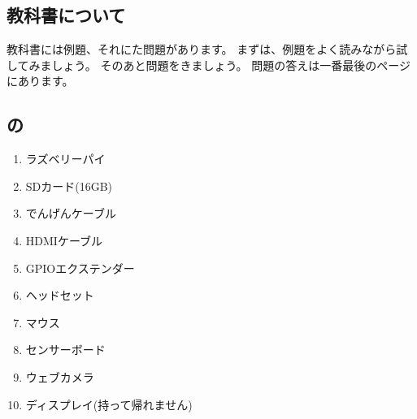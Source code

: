 % 
% 
\subsection{教科書について}
  教科書には例題、それにた問題があります。
  まずは、例題をよく読みながら試してみましょう。
  そのあと問題をきましょう。
  問題の答えは一番最後のページにあります。
\clearpage

% 
% 
\subsection{の}

\begin{enumerate}
  \item ラズベリーパイ
  \item SDカード(16GB)
  \item でんげんケーブル
  \item HDMIケーブル
  \item GPIOエクステンダー
  \item ヘッドセット
  \item マウス
  \item センサーボード
  \item ウェブカメラ
  \item ディスプレイ(持って帰れません)
\end{enumerate}

